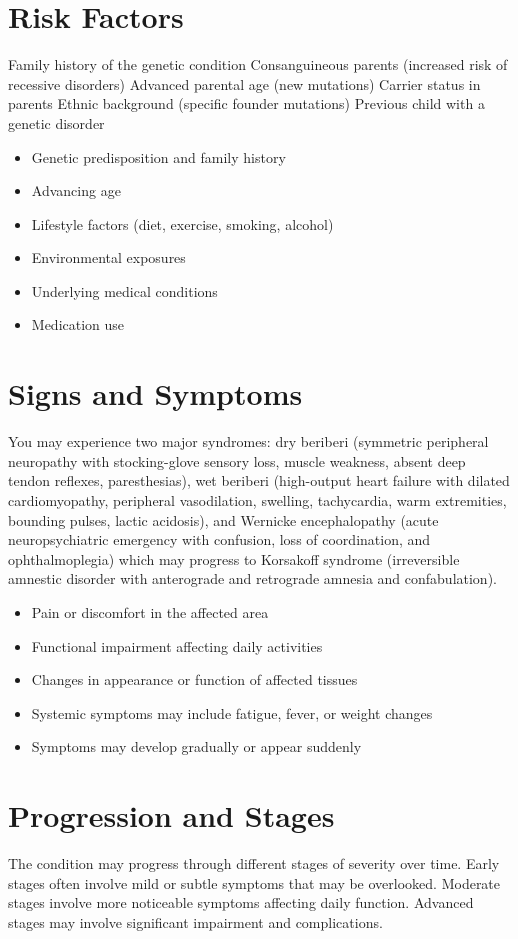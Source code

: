 \section{Risk Factors}
Family history of the genetic condition Consanguineous parents (increased risk of recessive disorders) Advanced parental age (new mutations) Carrier status in parents Ethnic background (specific founder mutations) Previous child with a genetic disorder

\begin{itemize}[noitemsep]
  \item Genetic predisposition and family history
  \item Advancing age
  \item Lifestyle factors (diet, exercise, smoking, alcohol)
  \item Environmental exposures
  \item Underlying medical conditions
  \item Medication use
\end{itemize}
\section{Signs and Symptoms}
You may experience two major syndromes: dry beriberi (symmetric peripheral neuropathy with stocking-glove sensory loss, muscle weakness, absent deep tendon reflexes, paresthesias), wet beriberi (high-output heart failure with dilated cardiomyopathy, peripheral vasodilation, swelling, tachycardia, warm extremities, bounding pulses, lactic acidosis), and Wernicke encephalopathy (acute neuropsychiatric emergency with confusion, loss of coordination, and ophthalmoplegia) which may progress to Korsakoff syndrome (irreversible amnestic disorder with anterograde and retrograde amnesia and confabulation).

\begin{itemize}[noitemsep]
  \item Pain or discomfort in the affected area
  \item Functional impairment affecting daily activities
  \item Changes in appearance or function of affected tissues
  \item Systemic symptoms may include fatigue, fever, or weight changes
  \item Symptoms may develop gradually or appear suddenly
\end{itemize}
\section{Progression and Stages}
The condition may progress through different stages of severity over time. Early stages often involve mild or subtle symptoms that may be overlooked. Moderate stages involve more noticeable symptoms affecting daily function. Advanced stages may involve significant impairment and complications.
